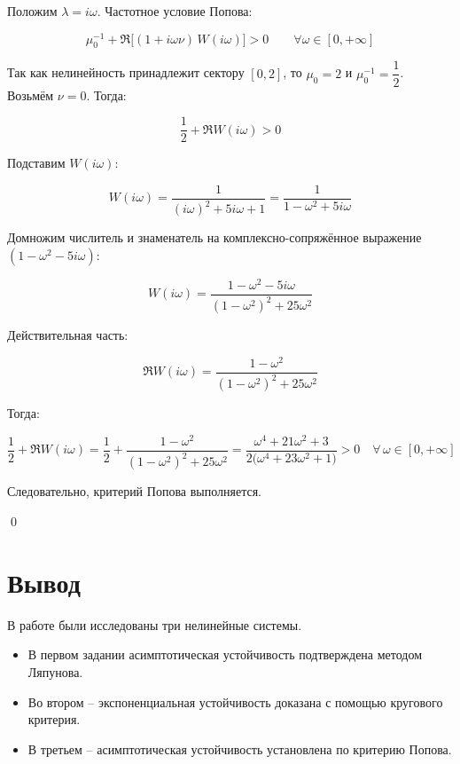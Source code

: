 \documentclass[a4paper,12pt]{article}
\begin{document}
\begin{enumerate}
		Положим \(\lambda = i\omega\). Частотное условие Попова:
		
		\[
		\mu_0^{-1} + \Re\bigl[(1 + i\omega\nu)\,W(i\omega)\bigr] > 0
		\qquad
		\forall\omega \in [0,+\infty]
		\]
		
		Так как нелинейность принадлежит сектору \([0,2]\), то \(\mu_0 = 2\) и
		\(\mu_0^{-1} = \dfrac{1}{2}\). Возьмём \(\nu = 0\). Тогда:
		
		\[
		\frac{1}{2} + \Re W(i\omega) > 0
		\]
		
		Подставим \(W(i\omega)\):
		
		\[
		W(i\omega)
		= \frac{1}{(i\omega)^2 + 5i\omega + 1}
		= \frac{1}{1 - \omega^2 + 5i\omega}
		\]
		
		Домножим числитель и знаменатель на комплексно-сопряжённое выражение
		\((1 - \omega^2 - 5i\omega)\):
		
		\[
		W(i\omega)
		= \frac{1 - \omega^2 - 5i\omega}{(1 - \omega^2)^2 + 25\omega^2}
		\]
		
		Действительная часть:
		
		\[
		\Re W(i\omega)
		= \frac{1 - \omega^2}{(1 - \omega^2)^2 + 25\omega^2}
		\]
		
		Тогда:
		
		\[
		\frac{1}{2} + \Re W(i\omega)
		= 
		\frac{1}{2}
		+
		\frac{1 - \omega^2}{(1 - \omega^2)^2 + 25\omega^2}
		=
		\frac{\omega^4 + 21\omega^2 + 3}
		{2\bigl(\omega^4 + 23\omega^2 + 1\bigr)}  > 0
		\quad \forall\,\omega \in [0,+\infty]
		\]

	\end{enumerate}
	
	Следовательно, критерий Попова выполняется.
	
	\qed
	
	\newpage
	\section{Вывод}
	
	В работе были исследованы три нелинейные системы.  
	
	\begin{itemize}
		\item В первом задании асимптотическая устойчивость подтверждена методом Ляпунова.  
		\item Во втором -- экспоненциальная устойчивость доказана с помощью кругового критерия.  
		\item В третьем -- асимптотическая устойчивость установлена по критерию Попова. 
	\end{itemize}
\end{document}
